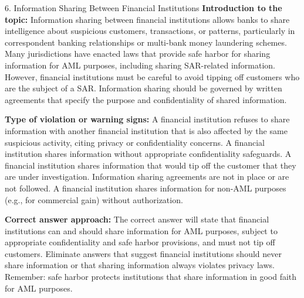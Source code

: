 \documentclass[11pt,a4paper]{beamer}
\begin{document}
\begin{frame}{6. Information Sharing Between Financial Institutions}
\tiny
\noindent\textbf{Introduction to the topic:} Information sharing between financial institutions allows banks to share intelligence about suspicious customers, transactions, or patterns, particularly in correspondent banking relationships or multi-bank money laundering schemes. Many jurisdictions have enacted laws that provide safe harbor for sharing information for AML purposes, including sharing SAR-related information. However, financial institutions must be careful to avoid tipping off customers who are the subject of a SAR. Information sharing should be governed by written agreements that specify the purpose and confidentiality of shared information.

\vspace{0.1cm}
\noindent\textbf{Type of violation or warning signs:} A financial institution refuses to share information with another financial institution that is also affected by the same suspicious activity, citing privacy or confidentiality concerns. A financial institution shares information without appropriate confidentiality safeguards. A financial institution shares information that would tip off the customer that they are under investigation. Information sharing agreements are not in place or are not followed. A financial institution shares information for non-AML purposes (e.g., for commercial gain) without authorization.

\vspace{0.1cm}
\noindent\textbf{Correct answer approach:} The correct answer will state that financial institutions can and should share information for AML purposes, subject to appropriate confidentiality and safe harbor provisions, and must not tip off customers. Eliminate answers that suggest financial institutions should never share information or that sharing information always violates privacy laws. Remember: safe harbor protects institutions that share information in good faith for AML purposes.
\end{frame}
\end{document}
